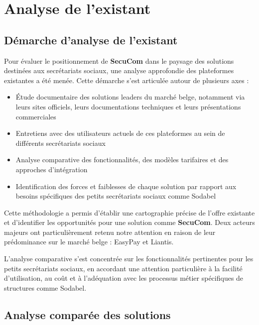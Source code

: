 \chapter{Analyse de l'existant}

\section{Démarche d'analyse de l'existant}

\noindent Pour évaluer le positionnement de \textbf{SecuCom} dans le paysage des solutions destinées aux secrétariats sociaux, une analyse approfondie des plateformes existantes a été menée. Cette démarche s'est articulée autour de plusieurs axes :

\begin{itemize}[leftmargin=*,label=\textcolor{darkgray}{$\bullet$},itemsep=0.3em]
  \item Étude documentaire des solutions leaders du marché belge, notamment via leurs sites officiels, leurs documentations techniques et leurs présentations commerciales
  \item Entretiens avec des utilisateurs actuels de ces plateformes au sein de différents secrétariats sociaux
  \item Analyse comparative des fonctionnalités, des modèles tarifaires et des approches d'intégration
  \item Identification des forces et faiblesses de chaque solution par rapport aux besoins spécifiques des petits secrétariats sociaux comme Sodabel
\end{itemize}

\vspace{0.5cm}

\noindent Cette méthodologie a permis d'établir une cartographie précise de l'offre existante et d'identifier les opportunités pour une solution comme \textbf{SecuCom}. Deux acteurs majeurs ont particulièrement retenu notre attention en raison de leur prédominance sur le marché belge : EasyPay et Liantis.

\begin{note}
L'analyse comparative s'est concentrée sur les fonctionnalités pertinentes pour les petits secrétariats sociaux, en accordant une attention particulière à la facilité d'utilisation, au coût et à l'adéquation avec les processus métier spécifiques de structures comme Sodabel.
\end{note}

\section{Analyse comparée des solutions}


